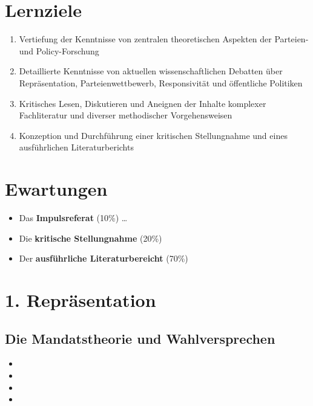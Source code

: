 \documentclass[abstract=on,parskip=full,headings=standardclasses,fontsize=11pt,paper=a4]{scrartcl}
\begin{document}
\section*{Lernziele}

\begin{enumerate}
\item Vertiefung der Kenntnisse von zentralen theoretischen Aspekten der Parteien- und Policy-Forschung
\item Detaillierte Kenntnisse von aktuellen wissenschaftlichen Debatten über Repräsentation, Parteienwettbewerb, Responsivität und öffentliche Politiken
\item  Kritisches Lesen, Diskutieren und Aneignen der Inhalte komplexer Fachliteratur und diverser methodischer Vorgehensweisen
\item Konzeption und Durchführung einer kritischen Stellungnahme und eines ausführlichen Literaturberichts
\end{enumerate}

\section*{Ewartungen}

\begin{itemize}
\item Das \textbf{Impulsreferat} (10\%) \dots
\item Die \textbf{kritische Stellungnahme} (20\%)
\item Der \textbf{ausführliche Literaturbereicht} (70\%) 
\end{itemize}

\tableofcontents


\section{1. Repräsentation}

\subsection{Die Mandatstheorie und Wahlversprechen}

\begin{itemize}
\item {}
\item {}
\item {}
\item {}
\end{itemize}
\end{document}
